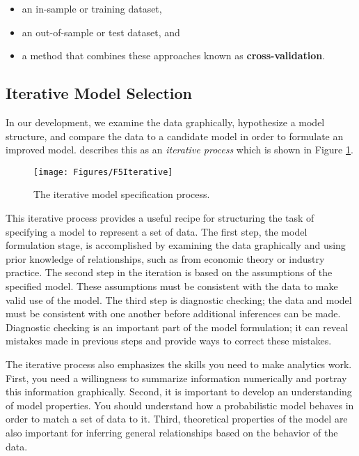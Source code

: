 \documentclass[]{book}
\theoremstyle{definition}
\theoremstyle{definition}
\theoremstyle{definition}
\theoremstyle{remark}
\begin{document}
\begin{itemize}
\item
  an in-sample or training dataset,
\item
  an out-of-sample or test dataset, and
\item
  a method that combines these approaches known as
  \textbf{cross-validation}.
\end{itemize}

\subsection{Iterative Model Selection}\label{iterative-model-selection}

In our development, we examine the data graphically, hypothesize a model
structure, and compare the data to a candidate model in order to
formulate an improved model. \citet{box1980sampling} describes this as
an \emph{iterative process} which is shown in Figure
\ref{fig:Iterative}.

\begin{figure}

{\centering \texttt{[image: Figures/F5Iterative]} 

}

\caption{The iterative model specification process.}\label{fig:Iterative}
\end{figure}

This iterative process provides a useful recipe for structuring the task
of specifying a model to represent a set of data. The first step, the
model formulation stage, is accomplished by examining the data
graphically and using prior knowledge of relationships, such as from
economic theory or industry practice. The second step in the iteration
is based on the assumptions of the specified model. These assumptions
must be consistent with the data to make valid use of the model. The
third step is diagnostic checking; the data and model must be consistent
with one another before additional inferences can be made. Diagnostic
checking is an important part of the model formulation; it can reveal
mistakes made in previous steps and provide ways to correct these
mistakes.

The iterative process also emphasizes the skills you need to make
analytics work. First, you need a willingness to summarize information
numerically and portray this information graphically. Second, it is
important to develop an understanding of model properties. You should
understand how a probabilistic model behaves in order to match a set of
data to it. Third, theoretical properties of the model are also
important for inferring general relationships based on the behavior of
the data.
\end{document}
